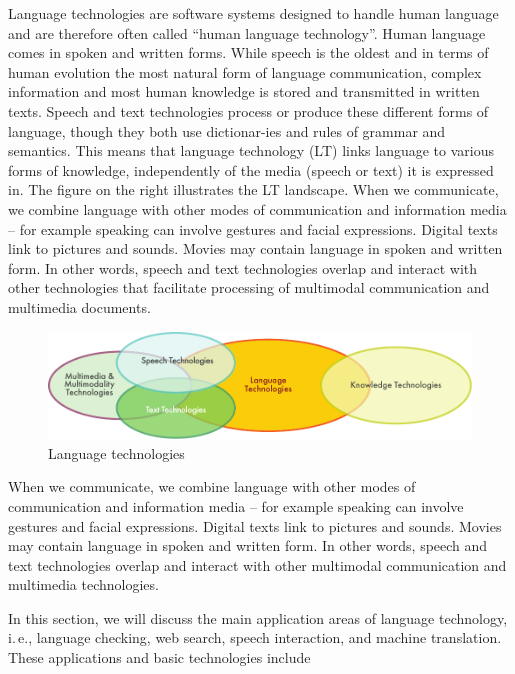 \begin{multicols}{2}

Language technologies are software systems designed to handle human language and are therefore often called “human language technology”. Human language comes in spoken and written forms. While speech is the oldest and in terms of human evolution the most natural form of language communication, complex information and most human knowledge is stored and transmitted in written texts. Speech and text technologies process or produce these different forms of language, though they both use dictionar-ies and rules of grammar and semantics. This means that language technology (LT) links language to various forms of knowledge, independently of the media (speech or text) it is expressed in. The figure on the right illustrates the LT landscape. When we communicate, we combine language with other modes of communication and information media -- for example speaking can involve gestures and facial expressions. Digital texts link to pictures and sounds. Movies may contain language in spoken and written form. In other words, speech and text technologies overlap and interact with other technologies that facilitate processing of multimodal communication and multimedia documents. 

\begin{figure}[htb]
  \center
  \includegraphics[width=\textwidth]{../_media/english/language_technologies}
  \caption{Language technologies}
  \label{fig:ltincontext_en}
\end{figure}

When we communicate, we combine language with other modes of communication and information media -- for example speaking can involve gestures and facial expressions. Digital texts link to pictures and sounds. Movies may contain language in spoken and written form. In other words, speech and text technologies overlap and interact with other multimodal communication and multimedia technologies.

In this section, we will discuss the main application areas of language technology, i.\,e., language checking, web search, speech interaction, and machine translation. These applications and basic technologies include 


\end{multicols}
